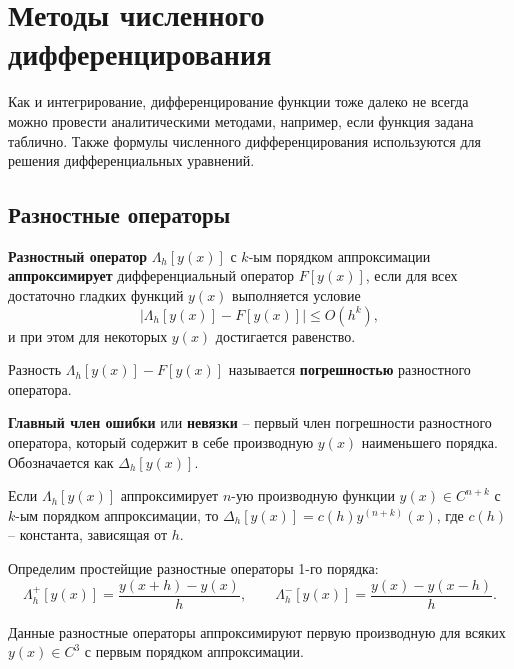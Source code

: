 \documentclass[../main.tex]{subfile}
\begin{document}
\section{Методы численного дифференцирования}
Как и интегрирование, дифференцирование функции тоже далеко не всегда можно
провести аналитическими методами, например, если функция задана таблично. Также
формулы численного дифференцирования используются для решения дифференциальных
уравнений.

\subsection{Разностные операторы}
\begin{define}
	\textbf{Разностный оператор} $\Lambda_h[y(x)]$ с $k$-ым порядком
	аппроксимации \textbf{аппроксимирует} дифференциальный оператор
	$F[y(x)]$, если для всех достаточно гладких функций $y(x)$ выполняется
	условие
	\[\big|\Lambda_h[y(x)]-F[y(x)]\big|\le O(h^k),\]
	и при этом для некоторых $y(x)$ достигается равенство.
\end{define}

\begin{define}
	Разность $\Lambda_h[y(x)]-F[y(x)]$ называется \textbf{погрешностью}
	разностного оператора.
\end{define}

\begin{define}
	\textbf{Главный член ошибки} или \textbf{невязки} -- первый член
	погрешности разностного оператора, который содержит в себе производную
	$y(x)$ наименьшего порядка. Обозначается как $\Delta_h[y(x)]$.

	Если $\Lambda_h[y(x)]$ аппроксимирует $n$-ую производную функции
	$y(x)\in C^{n+k}$ с $k$-ым порядком аппроксимации, то $\Delta_h[y(x)]=
	c(h)y^{(n+k)}(x)$, где $c(h)$ -- константа, зависящая от $h$.
\end{define}

\begin{define} \label{eq:simpliest_difference_operators}
	Определим простейщие разностные операторы 1-го порядка:
	\[\Lambda_h^+[y(x)]=\frac{y(x+h)-y(x)}{h},\qquad
	\Lambda_h^-[y(x)]=\frac{y(x)-y(x-h)}{h}.\]
\end{define}

\begin{lemma}
	Данные разностные операторы аппроксимируют первую производную для всяких
	$y(x)\in C^3$ с первым порядком аппроксимации.
\end{lemma}
\end{document}
